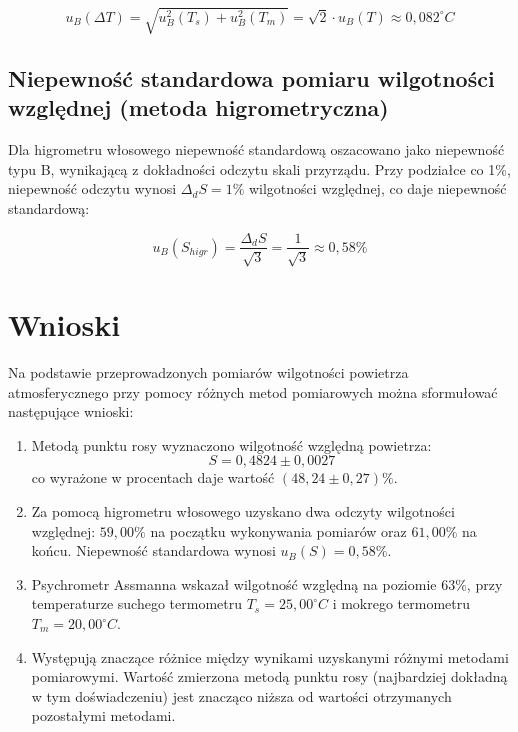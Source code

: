\documentclass[a4paper,12pt]{article}
\begin{document}
\begin{equation}
    u_B(\Delta T) = \sqrt{u_B^2(T_s) + u_B^2(T_m)} = \sqrt{2} \cdot u_B(T) \approx 0{,}082^\circ C
\end{equation}


\subsection{Niepewność standardowa pomiaru wilgotności względnej (metoda higrometryczna)}

Dla higrometru włosowego niepewność standardową oszacowano jako niepewność typu B, wynikającą z dokładności odczytu skali przyrządu. Przy podziałce co 1\%, niepewność odczytu wynosi $\Delta_d S = 1\%$ wilgotności względnej, co daje niepewność standardową:

\begin{equation}
    u_B(S_{higr}) = \frac{\Delta_d S}{\sqrt{3}} = \frac{1}{\sqrt{3}} \approx 0{,}58\%
\end{equation}

\section{Wnioski}

Na podstawie przeprowadzonych pomiarów wilgotności powietrza atmosferycznego przy pomocy różnych metod pomiarowych można sformułować następujące wnioski:

\begin{enumerate}
    \item Metodą punktu rosy wyznaczono wilgotność względną powietrza:
          \begin{equation}
              S = 0{,}4824 \pm 0{,}0027
          \end{equation}
          co wyrażone w procentach daje wartość $(48{,}24 \pm 0{,}27)\%$.

    \item Za pomocą higrometru włosowego uzyskano dwa odczyty wilgotności względnej: $59{,}00\%$ na początku wykonywania pomiarów oraz $61{,}00\%$ na końcu. Niepewność standardowa wynosi $u_B(S) = 0{,}58\%$.

    \item Psychrometr Assmanna wskazał wilgotność względną na poziomie $63\%$, przy temperaturze suchego termometru $T_s = 25{,}00^\circ C$ i mokrego termometru $T_m = 20{,}00^\circ C$.

    \item Występują znaczące różnice między wynikami uzyskanymi różnymi metodami pomiarowymi. Wartość zmierzona metodą punktu rosy (najbardziej dokładną w tym doświadczeniu) jest znacząco niższa od wartości otrzymanych pozostałymi metodami.

\end{enumerate}




\end{document}

